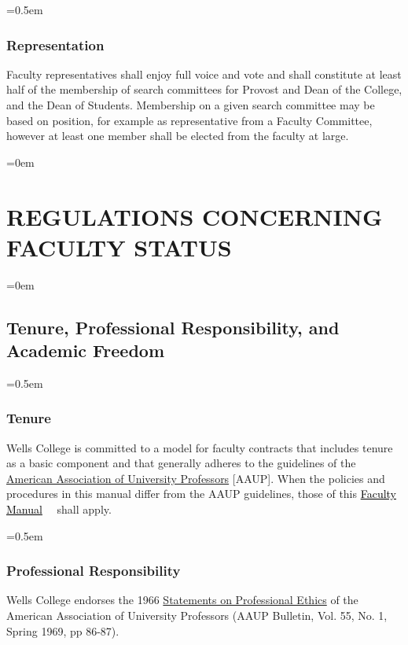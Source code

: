 \documentclass{manual}
\let\stdsection\section %
\renewcommand\section{\newpage\stdsection}
\newcommand{\keyword}[1]{\textcolor{black}{#1}}
\newcommand{\facman}{\keyword{\underline{Faculty Manual}}~}
\let\oldsection\section
\renewcommand\section{\leftskip=0em\oldsection}
\let\oldsubsection\subsection
\renewcommand\subsection{\leftskip=0em\oldsubsection}
\let\oldsubsubsection\subsubsection
\renewcommand\subsubsection{\leftskip=0.5em\oldsubsubsection}
\begin{document}
\subsubsection{Representation}
Faculty representatives shall enjoy full voice and vote and shall constitute at least half of the membership of search committees for Provost and Dean of the College, and the Dean of Students. Membership on a given search committee may be based on position, for example as representative from a Faculty Committee, however at least one member shall be elected from the faculty at large.


\section{REGULATIONS CONCERNING FACULTY STATUS}\label{art:RegulationsConcerningFacultyStatus}

\subsection{Tenure, Professional Responsibility, and Academic Freedom}\label{sec:TenureProfessionalResponsibilityAndAcademicFreedom}

\subsubsection{Tenure}

Wells College is committed to a model for faculty contracts that includes tenure as a basic component and that generally adheres to the guidelines of the \href{http://www.aaup.org/AAUP/}{American Association of University Professors} [AAUP]. When the policies and procedures in this manual differ from the AAUP guidelines, those of this \facman~ shall apply.

\subsubsection{Professional Responsibility}
Wells College endorses the 1966 \href{http://www.aaup.org/AAUP/pubsres/policydocs/contents/statementonprofessionalethics.htm}{Statements on Professional Ethics} of the American Association of University Professors (AAUP Bulletin, Vol. 55, No. 1, Spring 1969, pp 86-87).
\end{document}
